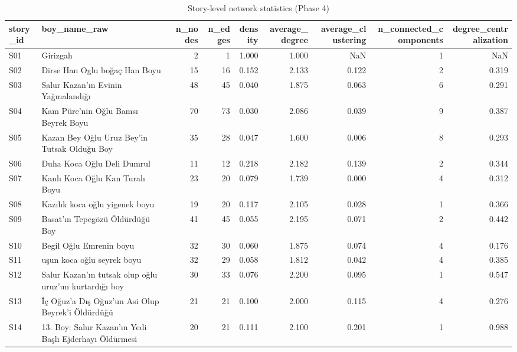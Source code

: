 \begin{table}
\caption{Story-level network statistics (Phase 4)}
\label{tab:t03_story_level_statistics}
\begin{tabular}{llrrrrrrr}
\toprule
story_id & boy_name_raw & n_nodes & n_edges & density & average_degree & average_clustering & n_connected_components & degree_centralization \\
\midrule
S01 & Girizgah & 2 & 1 & 1.000 & 1.000 & NaN & 1 & NaN \\
S02 & Dirse Han Oglu boğaç Han Boyu & 15 & 16 & 0.152 & 2.133 & 0.122 & 2 & 0.319 \\
S03 & Salur Kazan'ın Evinin Yağmalandığı & 48 & 45 & 0.040 & 1.875 & 0.063 & 6 & 0.291 \\
S04 & Kam Püre'nin Oğlu Bamsı Beyrek Boyu & 70 & 73 & 0.030 & 2.086 & 0.039 & 9 & 0.387 \\
S05 & Kazan Bey Oğlu Uruz Bey'in Tutsak Olduğu Boy & 35 & 28 & 0.047 & 1.600 & 0.006 & 8 & 0.293 \\
S06 & Duha Koca Oğlu Deli Dumrul & 11 & 12 & 0.218 & 2.182 & 0.139 & 2 & 0.344 \\
S07 & Kanlı Koca Oğlu Kan Turalı Boyu & 23 & 20 & 0.079 & 1.739 & 0.000 & 4 & 0.312 \\
S08 & Kazılık koca oğlu yigenek boyu & 19 & 20 & 0.117 & 2.105 & 0.028 & 1 & 0.366 \\
S09 & Basat'ın Tepegözü Öldürdüğü Boy & 41 & 45 & 0.055 & 2.195 & 0.071 & 2 & 0.442 \\
S10 & Begil Oğlu Emrenin boyu & 32 & 30 & 0.060 & 1.875 & 0.074 & 4 & 0.176 \\
S11 & uşun koca oğlu seyrek boyu & 32 & 29 & 0.058 & 1.812 & 0.042 & 4 & 0.385 \\
S12 & Salur Kazan'ın tutsak olup oğlu uruz'un kurtardığı boy & 30 & 33 & 0.076 & 2.200 & 0.095 & 1 & 0.547 \\
S13 & İç Oğuz'a Dış Oğuz'un Asi Olup Beyrek'i Öldürdüğü & 21 & 21 & 0.100 & 2.000 & 0.115 & 4 & 0.276 \\
S14 & 13. Boy: Salur Kazan'ın Yedi Başlı Ejderhayı Öldürmesi & 20 & 21 & 0.111 & 2.100 & 0.201 & 1 & 0.988 \\
\bottomrule
\end{tabular}
\end{table}
